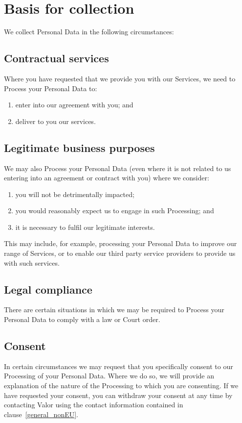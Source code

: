 \documentclass[10pt]{article}
\begin{document}
\section{Basis for collection}
We collect Personal Data in the following circumstances:

\subsection{Contractual services}
Where you have requested that we provide you with our Services, we need to Process your Personal Data to:
\begin{enumerate}[(1)]
	\item enter into our agreement with you; and

	\item deliver to you our services.
\end{enumerate}

\subsection{Legitimate business purposes}
We may also Process your Personal Data (even where it is not related to us entering into an agreement or contract with you) where we consider:
\begin{enumerate}[(1)]
	\item you will not be detrimentally impacted;

	\item you would reasonably expect us to engage in such Processing; and

	\item it is necessary to fulfil our legitimate interests.
\end{enumerate}
This may include, for example, processing your Personal Data to improve our range of Services, or to enable our third party service providers to provide us with such services.

\subsection{Legal compliance}
There are certain situations in which we may be required to Process your Personal Data to comply with a law or Court order.

\subsection{Consent}
In certain circumstances we may request that you specifically consent to our Processing of your Personal Data. Where we do so, we will provide an explanation of the nature of the Processing to which you are consenting. If we have requested your consent, you can withdraw your consent at any time by contacting Valor using the contact information contained in clause~\ref{general_nonEU}.
\end{document}
